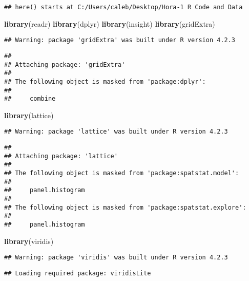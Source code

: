 \documentclass[
]{article}
\newenvironment{Shaded}{\begin{snugshade}}{\end{snugshade}}
\newcommand{\FunctionTok}[1]{\textcolor[rgb]{0.13,0.29,0.53}{\textbf{#1}}}
\newcommand{\NormalTok}[1]{#1}
\begin{document}
\begin{verbatim}
## here() starts at C:/Users/caleb/Desktop/Hora-1 R Code and Data
\end{verbatim}

\begin{Shaded}
\begin{Highlighting}[]
\FunctionTok{library}\NormalTok{(readr)}
\FunctionTok{library}\NormalTok{(dplyr)}
\FunctionTok{library}\NormalTok{(insight)}
\FunctionTok{library}\NormalTok{(gridExtra)}
\end{Highlighting}
\end{Shaded}

\begin{verbatim}
## Warning: package 'gridExtra' was built under R version 4.2.3
\end{verbatim}

\begin{verbatim}
## 
## Attaching package: 'gridExtra'
## 
## The following object is masked from 'package:dplyr':
## 
##     combine
\end{verbatim}

\begin{Shaded}
\begin{Highlighting}[]
\FunctionTok{library}\NormalTok{(lattice)}
\end{Highlighting}
\end{Shaded}

\begin{verbatim}
## Warning: package 'lattice' was built under R version 4.2.3
\end{verbatim}

\begin{verbatim}
## 
## Attaching package: 'lattice'
## 
## The following object is masked from 'package:spatstat.model':
## 
##     panel.histogram
## 
## The following object is masked from 'package:spatstat.explore':
## 
##     panel.histogram
\end{verbatim}

\begin{Shaded}
\begin{Highlighting}[]
\FunctionTok{library}\NormalTok{(viridis)}
\end{Highlighting}
\end{Shaded}

\begin{verbatim}
## Warning: package 'viridis' was built under R version 4.2.3
\end{verbatim}

\begin{verbatim}
## Loading required package: viridisLite
\end{verbatim}
\end{document}
